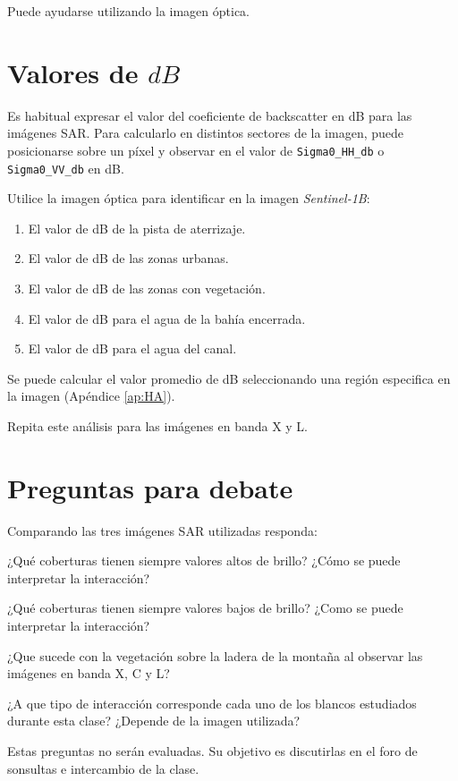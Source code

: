 Puede ayudarse utilizando la imagen óptica.


\section{Valores de $dB$}

Es habitual expresar el valor del coeficiente de backscatter en dB para las imágenes SAR. Para calcularlo en distintos sectores de la imagen, puede posicionarse sobre un píxel y observar en  el valor de \texttt{Sigma0\_HH\_db} o \texttt{Sigma0\_VV\_db} en dB.


Utilice la imagen óptica para identificar en la imagen \emph{Sentinel-1B}:

 \begin{enumerate}
     \item El valor de dB de la pista de aterrizaje.
     \item El valor de dB de las zonas urbanas.
     \item El valor de dB de las zonas con vegetación.
     \item El valor de dB para el agua de la bahía encerrada.
     \item El valor de dB para el agua del canal.
 \end{enumerate}

Se puede calcular el valor promedio de dB seleccionando una región especifica en la imagen (Apéndice \ref{ap:HA}).

Repita este análisis para las imágenes en banda X y L.

\section{Preguntas para debate}

Comparando las tres imágenes SAR utilizadas responda:

\begin{que}
    ¿Qué coberturas tienen siempre valores altos de brillo? ¿Cómo se puede interpretar la interacción?
\end{que}

\begin{que}
    ¿Qué coberturas tienen siempre valores bajos de brillo? ¿Como se puede interpretar la interacción?
\end{que}

\begin{que}
  ¿Que sucede con la vegetación sobre la ladera de la montaña al observar las imágenes en banda X, C y L?
\end{que}

\begin{que}
  ¿A que tipo de interacción corresponde cada uno de los blancos estudiados durante esta clase? ¿Depende de la imagen utilizada?
\end{que}

Estas preguntas no serán evaluadas. Su objetivo es discutirlas en el foro de sonsultas e intercambio de la clase.
